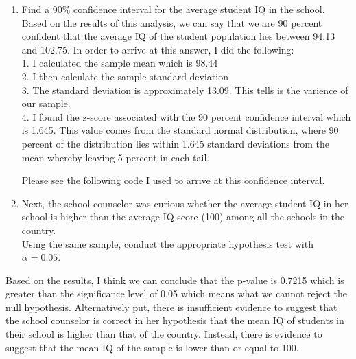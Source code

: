 \documentclass[12pt,letterpaper]{article}
\begin{document}
	\begin{enumerate}
		
		\item Find a 90\% confidence interval for the average student IQ in the school.\\
		
		\noindent 
		Based on the results of this analysis, we can say that we are 90 percent confident that the  average IQ of the student population lies between 94.13 and 102.75.  
		In order to arrive at this answer, I did the following:\\ 
		\vspace{.2cm}  
		1. I calculated the sample mean which is 98.44\\
		\vspace{.2cm} 
		2. I then calculate the sample standard deviation\\ 
		\vspace{.2cm} 
		3. The standard deviation is approximately 13.09. This tells is the varience of our sample. \\
		\vspace{.2cm} 
		4. I found the z-score associated with the 90 percent confidence interval which is 1.645. This value comes from the standard normal distribution, where 90 percent of the distribution lies within 1.645 standard deviations from the mean whereby leaving 5 percent in each tail. 
		
		
		Please see the following code I used to arrive at this confidence interval.
		
	 
		
		\vspace{1cm}
		\newpage 
		
		\item Next, the school counselor was curious  whether  the average student IQ in her school is higher than the average IQ score (100) among all the schools in the country.\\ 
		
		
		\noindent Using the same sample, conduct the appropriate hypothesis test with $\alpha=0.05$.
	\end{enumerate}
	

	Based on the results, I think we can conclude that the p-value is 0.7215 which is greater than the significance level of 0.05 which means what we cannot reject the null hypothesis. Alternatively put, there is insufficient evidence to suggest that the school counselor is correct in her hypothesis that the mean IQ of students in their school is higher than that of the country. Instead, there is evidence to suggest that the mean IQ of the sample is lower than or equal to 100.\\ 
\end{document}
